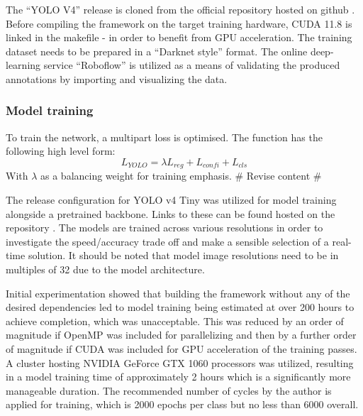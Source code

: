 \documentclass[a4paper,twoside,12pt]{report}
\begin{document}
 The ``YOLO V4'' release is cloned from the official repository hosted on github \citep{yolov4repo}. Before compiling the framework on the target training hardware, CUDA 11.8 is linked in the makefile - in order to benefit from GPU acceleration. The training dataset needs to be prepared in a ``Darknet style'' format. The online deep-learning service ``Roboflow'' \citep{roboflow} is utilized as a means of validating the produced annotations by importing and visualizing the data. 

\subsubsection{Model training}


To train the network, a multipart loss is optimised. The function has the following high level form:
\begin{equation}
L_{YOLO} =  \lambda L_{reg} + L_{confi} + L_{cls} 
\end{equation} 
With $\lambda$ as a balancing weight for training emphasis.  \# Revise content \# 

The release configuration for YOLO v4 Tiny was utilized for model training alongside a pretrained backbone. Links to these can be found hosted on the repository \citep{yolov4repo}. The models are trained across various resolutions in order to investigate the speed/accuracy trade off and make a sensible selection of a real-time solution. It should be noted that model image resolutions need to be in multiples of 32 due to the model architecture.

Initial experimentation showed that building the framework without any of the desired dependencies led to model training being estimated at over 200 hours to achieve completion, which was unacceptable. This was reduced by an order of magnitude if OpenMP was included for parallelizing and then by a further order of magnitude if CUDA was included for GPU acceleration of the training passes. A cluster hosting NVIDIA GeForce GTX 1060 processors was utilized, resulting in a model training time of approximately 2 hours which is a significantly more manageable duration. The recommended number of cycles by the author is applied for training, which is 2000 epochs per class but no less than 6000 overall.
\end{document}
